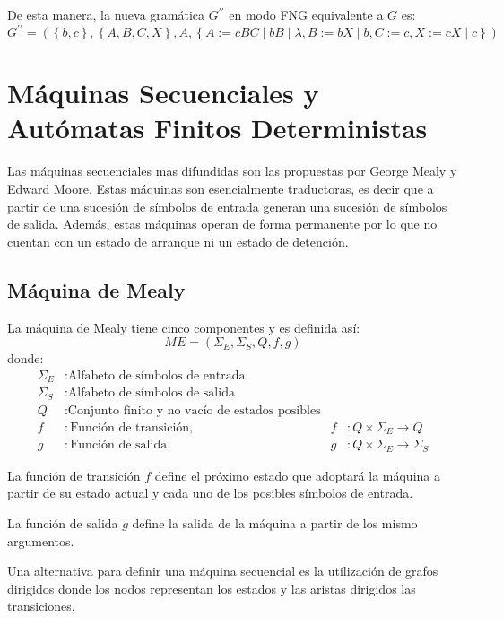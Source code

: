 \documentclass[12pt]{article}
\begin{document}
De esta manera, la nueva gramática $ G^{\prime\prime} $ en modo FNG equivalente a $ G $ es:
\[
G^{\prime\prime} = \left(\left\{b,c\right\},\left\{A,B,C,X\right\},A,\left\{A:=cBC \mid bB \mid \lambda,B:=bX \mid b,C:=c,X:=cX \mid c\right\}\right)
\]

\section{Máquinas Secuenciales y Autómatas Finitos Deterministas}
Las máquinas secuenciales mas difundidas son las propuestas por George Mealy y Edward Moore. Estas máquinas son esencialmente traductoras, es decir que a partir de una sucesión de símbolos de entrada generan una sucesión de símbolos de salida. Además, estas máquinas operan de forma permanente por lo que no cuentan con un estado de arranque ni un estado de detención.

\subsection{Máquina de Mealy}
La máquina de Mealy tiene cinco componentes y es definida así:
\[
	ME = \left(\Sigma_{E}, \Sigma_{S}, Q, f, g\right)
\]
donde:
\begin{align*}
  \Sigma_{E} &: \text{Alfabeto de símbolos de entrada}\\
  \Sigma_{S} &: \text{Alfabeto de símbolos de salida}\\
  Q &: \text{Conjunto finito y no vacío de estados posibles}\\
  f &: \text{Función de transición}, &f&:Q\times\Sigma_{E} \to Q\\
  g &: \text{Función de salida}, &g&:Q\times\Sigma_{E} \to \Sigma_{S}
\end{align*}

La función de transición $ f $ define el próximo estado que adoptará la máquina a partir de su estado actual y cada uno de los posibles símbolos de entrada.

La función de salida $ g $ define la salida de la máquina a partir de los mismo argumentos.

Una alternativa para definir una máquina secuencial es la utilización de grafos dirigidos donde los nodos representan los estados y las aristas dirigidos las transiciones.
\end{document}
